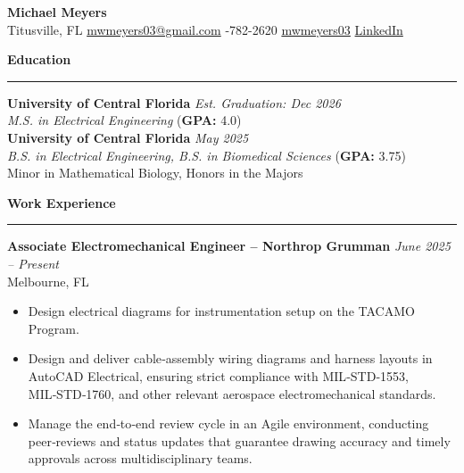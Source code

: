 \documentclass[9pt,letterpaper]{article}
\newcommand{\sectionHeading}[1]{%
  \noindent\textbf{\large\textcolor{myblue}{#1}}%
  \par\vspace{-1.5ex}%
  \noindent\textcolor{myblue}{\rule{\linewidth}{0.7pt}}%
}
\begin{document}
\begin{center}
  {\LARGE \textbf{Michael Meyers}}\\
  \vspace{0.5pt}
  Titusville, FL \quad 
  \href{mailto:mwmeyers03@gmail.com}{\textcolor{myblue}{\faEnvelope\; mwmeyers03@gmail.com}}\quad
  \faPhone{}-782-2620\quad
  \href{https://github.com/mwmeyers03}{\textcolor{myblue}{\faGithub\; mwmeyers03}}\quad
  \href{https://www.linkedin.com/in/michael-meyers-37b0071b1/}{\textcolor{myblue}{\faLinkedin\; LinkedIn}}
\end{center}


\sectionHeading{Education}
\textbf{University of Central Florida} 
\hfill \textit{Est. Graduation: Dec 2026}\\
\textit{M.S. in Electrical Engineering} \quad(\textbf{GPA:} 4.0)\\
\textbf{University of Central Florida} 
\hfill \textit{May 2025}\\
\textit{B.S. in Electrical Engineering, B.S. in Biomedical Sciences} \quad(\textbf{GPA:} 3.75)\\
Minor in Mathematical Biology, Honors in the Majors

\sectionHeading{Work Experience}

\textbf{Associate Electromechanical Engineer -- Northrop Grumman}
\hfill \textit{June 2025 -- Present}\\
Melbourne, FL
\begin{itemize}
  \item Design electrical diagrams for instrumentation setup on the TACAMO Program.
  \item Design and deliver cable‑assembly wiring diagrams and harness layouts in AutoCAD Electrical, ensuring strict compliance with MIL‑STD‑1553, MIL‑STD‑1760, and other relevant aerospace electromechanical standards.
  \item Manage the end‑to‑end review cycle in an Agile environment, conducting peer‑reviews and status updates that guarantee drawing accuracy and timely approvals across multidisciplinary teams.



 
\end{itemize}
\end{document}
